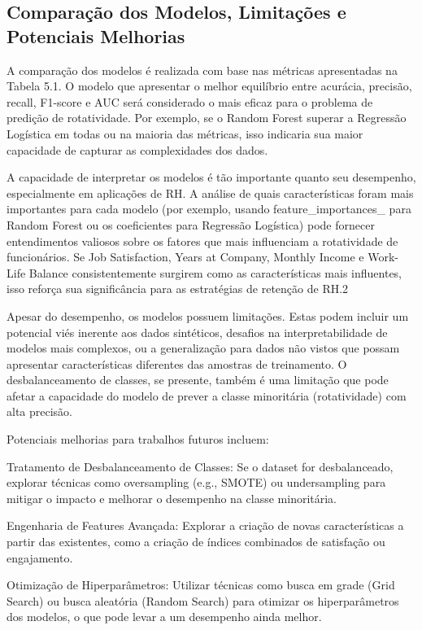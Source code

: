 \documentclass[sigconf]{acmart}
\begin{document}
\subsection{Comparação dos Modelos, Limitações e Potenciais Melhorias}
A comparação dos modelos é realizada com base nas métricas apresentadas na Tabela 5.1. O modelo que apresentar o melhor equilíbrio entre acurácia, precisão, recall, F1-score e AUC será considerado o mais eficaz para o problema de predição de rotatividade. Por exemplo, se o Random Forest superar a Regressão Logística em todas ou na maioria das métricas, isso indicaria sua maior capacidade de capturar as complexidades dos dados.

A capacidade de interpretar os modelos é tão importante quanto seu desempenho, especialmente em aplicações de RH. A análise de quais características foram mais importantes para cada modelo (por exemplo, usando feature\_importances\_ para Random Forest ou os coeficientes para Regressão Logística) pode fornecer entendimentos valiosos sobre os fatores que mais influenciam a rotatividade de funcionários. Se Job Satisfaction, Years at Company, Monthly Income e Work-Life Balance consistentemente surgirem como as características mais influentes, isso reforça sua significância para as estratégias de retenção de RH.2

Apesar do desempenho, os modelos possuem limitações. Estas podem incluir um potencial viés inerente aos dados sintéticos, desafios na interpretabilidade de modelos mais complexos, ou a generalização para dados não vistos que possam apresentar características diferentes das amostras de treinamento. O desbalanceamento de classes, se presente, também é uma limitação que pode afetar a capacidade do modelo de prever a classe minoritária (rotatividade) com alta precisão.

Potenciais melhorias para trabalhos futuros incluem:

Tratamento de Desbalanceamento de Classes: Se o dataset for desbalanceado, explorar técnicas como oversampling (e.g., SMOTE) ou undersampling para mitigar o impacto e melhorar o desempenho na classe minoritária.

Engenharia de Features Avançada: Explorar a criação de novas características a partir das existentes, como a criação de índices combinados de satisfação ou engajamento.

Otimização de Hiperparâmetros: Utilizar técnicas como busca em grade (Grid Search) ou busca aleatória (Random Search) para otimizar os hiperparâmetros dos modelos, o que pode levar a um desempenho ainda melhor.
\end{document}
